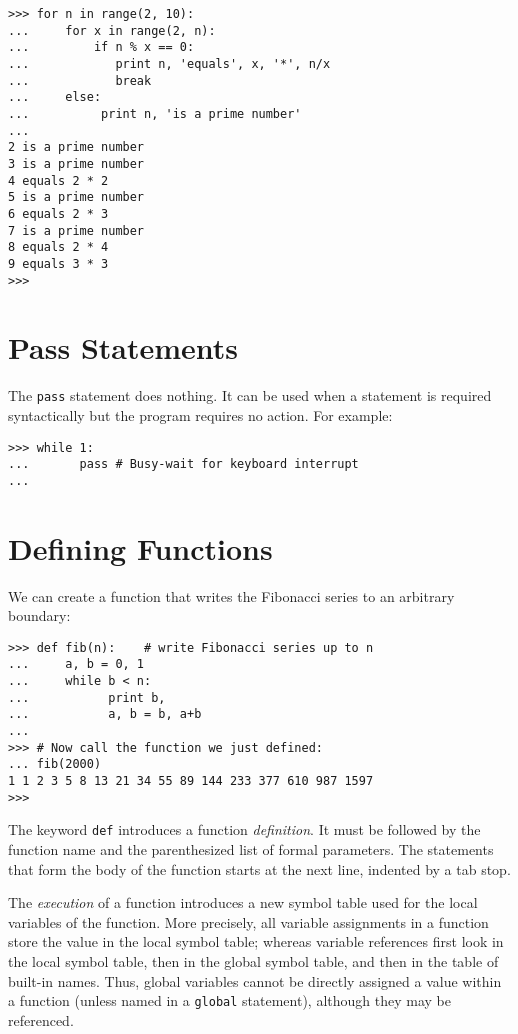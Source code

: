\bcode\begin{verbatim}
>>> for n in range(2, 10):
...     for x in range(2, n):
...         if n % x == 0:
...            print n, 'equals', x, '*', n/x
...            break
...     else:
...          print n, 'is a prime number'
... 
2 is a prime number
3 is a prime number
4 equals 2 * 2
5 is a prime number
6 equals 2 * 3
7 is a prime number
8 equals 2 * 4
9 equals 3 * 3
>>> 
\end{verbatim}\ecode

\section{Pass Statements}

The {\tt pass} statement does nothing.
It can be used when a statement is required syntactically but the
program requires no action.
For example:

\bcode\begin{verbatim}
>>> while 1:
...       pass # Busy-wait for keyboard interrupt
... 
\end{verbatim}\ecode

\section{Defining Functions}

We can create a function that writes the Fibonacci series to an
arbitrary boundary:

\bcode\begin{verbatim}
>>> def fib(n):    # write Fibonacci series up to n
...     a, b = 0, 1
...     while b < n:
...           print b,
...           a, b = b, a+b
... 
>>> # Now call the function we just defined:
... fib(2000)
1 1 2 3 5 8 13 21 34 55 89 144 233 377 610 987 1597
>>> 
\end{verbatim}\ecode
%
The keyword {\tt def} introduces a function {\em definition}.  It must
be followed by the function name and the parenthesized list of formal
parameters.  The statements that form the body of the function starts at
the next line, indented by a tab stop.

The {\em execution} of a function introduces a new symbol table used
for the local variables of the function.  More precisely, all variable
assignments in a function store the value in the local symbol table;
whereas
variable references first look in the local symbol table, then
in the global symbol table, and then in the table of built-in names.
Thus,
global variables cannot be directly assigned a value within a
function (unless named in a {\tt global} statement), although
they may be referenced.

